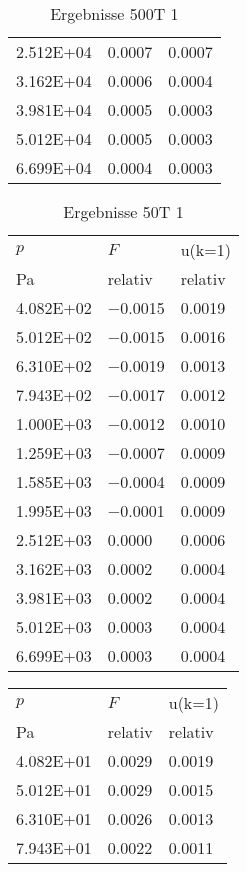 \begin{table}
\begin{tabular}{l l l }
\num{2.512E+04}&\num{0.0007}&\num{0.0007}\\
\num{3.162E+04}&\num{0.0006}&\num{0.0004}\\
\num{3.981E+04}&\num{0.0005}&\num{0.0003}\\
\num{5.012E+04}&\num{0.0005}&\num{0.0003}\\
\num{6.699E+04}&\num{0.0004}&\num{0.0003}\\
\bottomrule
\end{tabular}\caption{Ergebnisse 500T 1}\end{table}\begin{table}\begin{tabular}{l l l }
\toprule
$p$&$F$&u(k=1)\\
 Pa & relativ & relativ\\\midrule
\num{4.082E+02}&\num{-0.0015}&\num{0.0019}\\
\num{5.012E+02}&\num{-0.0015}&\num{0.0016}\\
\num{6.310E+02}&\num{-0.0019}&\num{0.0013}\\
\num{7.943E+02}&\num{-0.0017}&\num{0.0012}\\
\num{1.000E+03}&\num{-0.0012}&\num{0.0010}\\
\num{1.259E+03}&\num{-0.0007}&\num{0.0009}\\
\num{1.585E+03}&\num{-0.0004}&\num{0.0009}\\
\num{1.995E+03}&\num{-0.0001}&\num{0.0009}\\
\num{2.512E+03}&\num{0.0000}&\num{0.0006}\\
\num{3.162E+03}&\num{0.0002}&\num{0.0004}\\
\num{3.981E+03}&\num{0.0002}&\num{0.0004}\\
\num{5.012E+03}&\num{0.0003}&\num{0.0004}\\
\num{6.699E+03}&\num{0.0003}&\num{0.0004}\\
\bottomrule
\end{tabular}\caption{Ergebnisse 50T 1}\end{table}\begin{table}\begin{tabular}{l l l }
\toprule
$p$&$F$&u(k=1)\\
 Pa & relativ & relativ\\\midrule
\num{4.082E+01}&\num{0.0029}&\num{0.0019}\\
\num{5.012E+01}&\num{0.0029}&\num{0.0015}\\
\num{6.310E+01}&\num{0.0026}&\num{0.0013}\\
\num{7.943E+01}&\num{0.0022}&\num{0.0011}\\

\end{tabular}
\end{table}
